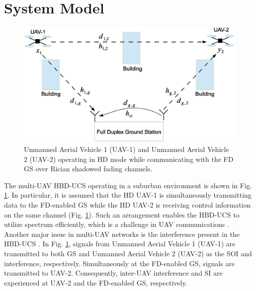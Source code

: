 \section{System Model} \label{HBD_UCS_Rician_Shadowed_sec_sys_model}
\begin{figure} [tpb]
\centering
\includegraphics [width=0.5\columnwidth]{chap5_fig/block_diagram.eps}
\vspace{-1cm}
\caption{Unmanned Aerial Vehicle 1 (UAV-1) and Unmanned Aerial Vehicle 2 (UAV-2) operating in HD mode while communicating with the FD GS over Rician shadowed fading channels.}
\label{fig:HBD_UCS_Rician_Shadowed_block_diagram}
\end{figure}

The multi-UAV HBD-UCS operating in a suburban environment is shown in Fig. \ref{fig:HBD_UCS_Rician_Shadowed_block_diagram}. In particular, it is assumed that the HD UAV-1 is simultaneously transmitting data to the FD-enabled GS while the HD UAV-2 is receiving control information on the same channel (Fig. \ref{fig:HBD_UCS_Rician_Shadowed_block_diagram}). Such an arrangement enables the HBD-UCS to utilize spectrum efficiently, which is a challenge in UAV communications \cite{matolak2017air_suburban}. Another major issue in multi-UAV networks is the interference present in the HBD-UCS \cite{motlagh2016low}. In Fig. \ref{fig:HBD_UCS_Rician_Shadowed_block_diagram}, signals from Unmanned Aerial Vehicle 1 (UAV-1) are transmitted to both GS and Unmanned Aerial Vehicle 2 (UAV-2) as the SOI and interference, respectively. Simultaneously at the FD-enabled GS, signals are transmitted to UAV-2. Consequently, inter-UAV interference and SI are experienced at UAV-2 and the FD-enabled GS, respectively.


